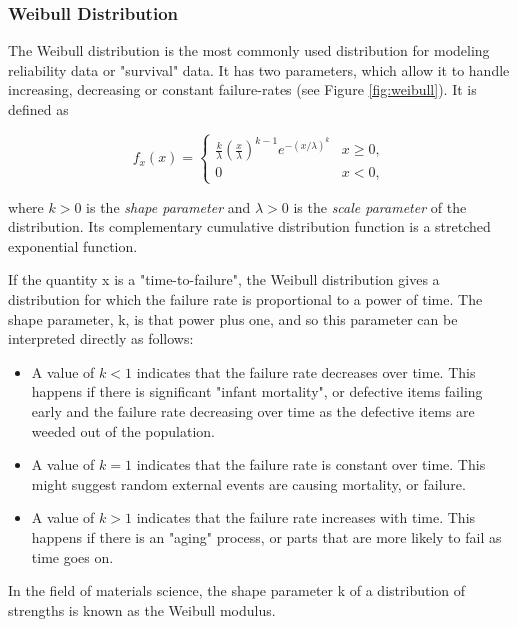 \subsubsection{Weibull Distribution}

The Weibull distribution is the most commonly used distribution for modeling reliability data or "survival" data. It has two parameters, which allow it to handle increasing, decreasing or constant failure-rates (see Figure \ref{fig:weibull}).
It is defined as

\begin{equation}\label{eq_weibull}
f_x (x) =
  \begin{cases}
    \frac{k}{\lambda}\left(\frac{x}{\lambda}\right)^{k-1}e^{-(x/\lambda)^{k}} & x\geq0 ,\\
    0 & x<0 ,
    \end{cases}
\end{equation}

where $k > 0$ is the \emph{shape parameter }and $\lambda > 0$ is the \emph{scale parameter }of the distribution. Its complementary cumulative distribution function is a stretched exponential function.

If the quantity x is a "time-to-failure", the Weibull distribution gives a distribution for which the failure rate is proportional to a power of time. The shape parameter, k, is that power plus one, and so this parameter can be interpreted directly as follows:

\begin{itemize}
  \item  A value of $k < 1$ indicates that the failure rate decreases over time. This happens if there is significant "infant mortality", or defective items failing early and the failure rate decreasing over time as the defective items are weeded out of the population.

  \item  A value of $k = 1$ indicates that the failure rate is constant over time. This might suggest random external events are causing mortality, or failure.
  \item  A value of $k > 1$ indicates that the failure rate increases with time. This happens if there is an "aging" process, or parts that are more likely to fail as time goes on.
\end{itemize}

In the field of materials science, the shape parameter k of a distribution of strengths is known as the Weibull modulus.

